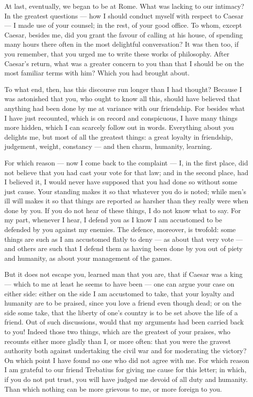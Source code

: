  At last, eventually, we began to be at Rome. What was lacking to our intimacy? In the greatest questions --- how I should conduct myself with respect to Caesar --- I made use of your counsel; in the rest, of your good office. To whom, except Caesar, besides me, did you grant the favour of calling at his house, of spending many hours there often in the most delightful conversation? It was then too, if you remember, that you urged me to write these works of philosophy. After Caesar's return, what was a greater concern to you than that I should be on the most familiar terms with him? Which you had brought about.

 To what end, then, has this discourse run longer than I had thought? Because I was astonished that you, who ought to know all this, should have believed that anything had been done by me at variance with our friendship. For besides what I have just recounted, which is on record and conspicuous, I have many things more hidden, which I can scarcely follow out in words. Everything about you delights me, but most of all the greatest things: a great loyalty in friendship, judgement, weight, constancy --- and then charm, humanity, learning.

 For which reason --- now I come back to the complaint --- I, in the first place, did not believe that you had cast your vote for that law; and in the second place, had I believed it, I would never have supposed that you had done so without some just cause. Your standing makes it so that whatever you do is noted; while men's ill will makes it so that things are reported as harsher than they really were when done by you. If you do not hear of these things, I do not know what to say. For my part, whenever I hear, I defend you as I know I am accustomed to be defended by you against my enemies. The defence, moreover, is twofold: some things are such as I am accustomed flatly to deny --- as about that very vote --- and others are such that I defend them as having been done by you out of piety and humanity, as about your management of the games.

 But it does not escape you, learned man that you are, that if Caesar was a king --- which to me at least he seems to have been --- one can argue your case on either side: either on the side I am accustomed to take, that your loyalty and humanity are to be praised, since you love a friend even though dead; or on the side some take, that the liberty of one's country is to be set above the life of a friend. Out of such discussions, would that my arguments had been carried back to you! Indeed those two things, which are the greatest of your praises, who recounts either more gladly than I, or more often: that you were the gravest authority both against undertaking the civil war and for moderating the victory? On which point I have found no one who did not agree with me. For which reason I am grateful to our friend Trebatius for giving me cause for this letter; in which, if you do not put trust, you will have judged me devoid of all duty and humanity. Than which nothing can be more grievous to me, or more foreign to you.
